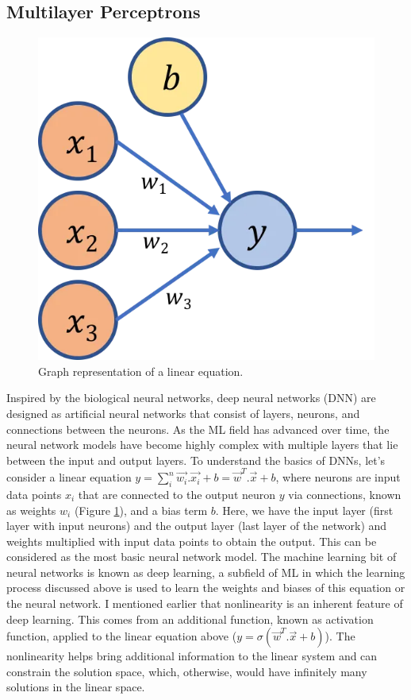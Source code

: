 \subsection{Multilayer Perceptrons}

\begin{figure}
  \centering
   \includegraphics[width=\linewidth]{Images/neuron.png}
   \caption{Graph representation of a linear equation.}
   \label{fig:neuron}
\end{figure}

Inspired by the biological neural networks, deep neural networks (DNN) are designed as artificial neural networks that consist of layers, neurons, and connections between the neurons. As the ML field has advanced over time, the neural network models have become highly complex with multiple layers that lie between the input and output layers. To understand the basics of DNNs, let's consider a linear equation $y = \sum^n_i\vec{w_i} . \vec{x_i} + b = \vec{w}^T . \vec{x} + b$, where neurons are input data points $x_i$ that are connected to the output neuron $y$ via connections, known as weights $w_i$ (Figure \ref{fig:neuron}), and a bias term $b$. Here, we have the input layer (first layer with input neurons) and the output layer (last layer of the network)  and weights multiplied with input data points to obtain the output. This can be considered as the most basic neural network model. The machine learning bit of neural networks is known as deep learning, a subfield of ML in which the learning process discussed above is used to learn the weights and biases of this equation or the neural network. I mentioned earlier that nonlinearity is an inherent feature of deep learning. This comes from an additional function, known as activation function, applied to the linear equation above ($y = \sigma(\vec{w} ^T. \vec{x} + b)$). The nonlinearity helps bring additional information to the linear system and can constrain the solution space, which, otherwise, would have infinitely many solutions in the linear space. 


